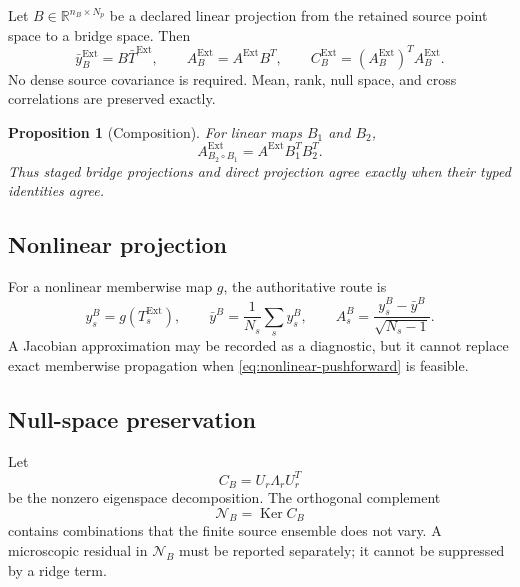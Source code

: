 \documentclass[11pt]{article}
\newtheorem{proposition}[definition]{Proposition}
\newcommand{\Ker}{\operatorname{Ker}}
\newcommand{\cN}{\mathcal N}
\newcommand{\Ext}{\ensuremath{\mathrm{Ext}}}
\newcommand{\R}{\mathbb R}
\begin{document}
Let \(B\in\R^{n_B\times N_p}\) be a declared linear projection from the retained source point space to a bridge space.  Then
\begin{equation}
 \bar y_B^{\Ext}
 =B\bar T^{\Ext},
 \qquad
 A_B^{\Ext}
 =A^{\Ext}B^T,
 \qquad
 C_B^{\Ext}
 =\left(A_B^{\Ext}\right)^TA_B^{\Ext}.
 \label{eq:linear-pushforward}
\end{equation}
No dense source covariance is required.  Mean, rank, null space, and cross correlations are preserved exactly.

\begin{proposition}[Composition]
For linear maps \(B_1\) and \(B_2\),
\begin{equation}
 A_{B_2\circ B_1}^{\Ext}
 =A^{\Ext}B_1^TB_2^T.
 \label{eq:projection-composition}
\end{equation}
Thus staged bridge projections and direct projection agree exactly when their typed identities agree.
\end{proposition}

\subsection{Nonlinear projection}

For a nonlinear memberwise map \(g\), the authoritative route is
\begin{equation}
 y_{s}^{B}
 =g(T_s^{\Ext}),
 \qquad
 \bar y^B
 =\frac1{N_s}\sum_s y_s^B,
 \qquad
 A_{s}^{B}
 =\frac{y_s^B-\bar y^B}{\sqrt{N_s-1}}.
 \label{eq:nonlinear-pushforward}
\end{equation}
A Jacobian approximation may be recorded as a diagnostic, but it cannot replace exact memberwise propagation when \cref{eq:nonlinear-pushforward} is feasible.

\subsection{Null-space preservation}

Let
\begin{equation}
 C_B=U_r\Lambda_rU_r^T
 \label{eq:cov-eigendecomp}
\end{equation}
be the nonzero eigenspace decomposition.  The orthogonal complement
\begin{equation}
 \cN_B=\Ker C_B
 \label{eq:nullspace}
\end{equation}
contains combinations that the finite source ensemble does not vary.  A microscopic residual in \(\cN_B\) must be reported separately; it cannot be suppressed by a ridge term.
\end{document}
